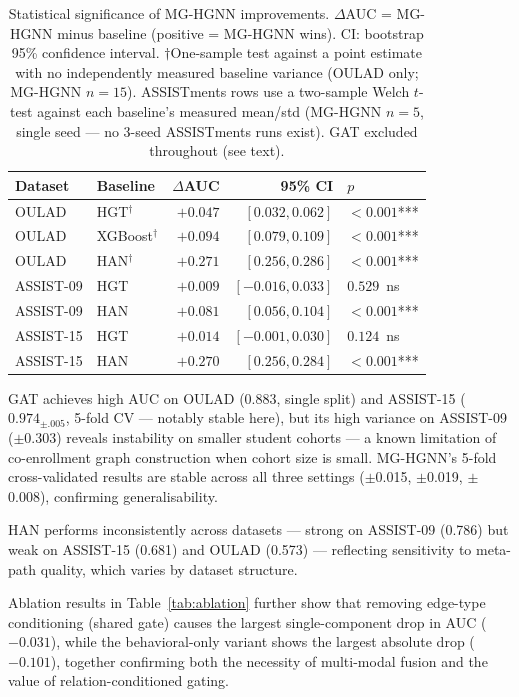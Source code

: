 \documentclass[sigconf,review]{acmart}
\begin{document}
\begin{table}[h]
\centering
\caption{Statistical significance of MG-HGNN improvements.
  $\Delta$AUC = MG-HGNN minus baseline (positive = MG-HGNN
  wins). CI: bootstrap 95\% confidence interval.
  $\dagger$One-sample test against a point estimate with no
  independently measured baseline variance (OULAD only; MG-HGNN
  $n{=}15$). ASSISTments rows use a two-sample Welch $t$-test
  against each baseline's measured mean/std (MG-HGNN $n{=}5$,
  single seed --- no 3-seed ASSISTments runs exist). GAT
  excluded throughout (see text).}
\label{tab:significance}
\begin{tabular}{llrrl}
\toprule
\textbf{Dataset} & \textbf{Baseline}
  & \textbf{$\Delta$AUC}
  & \textbf{95\% CI}
  & \textbf{$p$} \\
\midrule
OULAD   & HGT$^\dagger$     & $+0.047$
  & $[0.032, 0.062]$ & $<0.001$*** \\
OULAD   & XGBoost$^\dagger$ & $+0.094$
  & $[0.079, 0.109]$ & $<0.001$*** \\
OULAD   & HAN$^\dagger$     & $+0.271$
  & $[0.256, 0.286]$ & $<0.001$*** \\
ASSIST-09 & HGT             & $+0.009$
  & $[-0.016, 0.033]$ & $0.529$~ns \\
ASSIST-09 & HAN             & $+0.081$
  & $[0.056, 0.104]$ & $<0.001$*** \\
ASSIST-15 & HGT             & $+0.014$
  & $[-0.001, 0.030]$ & $0.124$~ns \\
ASSIST-15 & HAN             & $+0.270$
  & $[0.256, 0.284]$ & $<0.001$*** \\
\bottomrule
\end{tabular}
\end{table}

GAT achieves high AUC on OULAD (0.883, single
split) and ASSIST-15 ($0.974_{\pm.005}$, 5-fold
CV --- notably stable here), but its high
variance on ASSIST-09 ($\pm$0.303) reveals
instability on smaller student cohorts --- a known
limitation of co-enrollment graph construction
when cohort size is small. MG-HGNN's 5-fold
cross-validated results are stable across all
three settings ($\pm$0.015, $\pm$0.019,
$\pm$0.008), confirming generalisability.

HAN performs inconsistently across datasets ---
strong on ASSIST-09 (0.786) but weak on ASSIST-15
(0.681) and OULAD (0.573) --- reflecting
sensitivity to meta-path quality, which varies by
dataset structure.

Ablation results in Table~\ref{tab:ablation} further
show that removing edge-type conditioning (shared gate)
causes the largest single-component drop in AUC
($-0.031$), while the behavioral-only variant shows the
largest absolute drop ($-0.101$), together confirming
both the necessity of multi-modal fusion and the value
of relation-conditioned gating.
\end{document}
